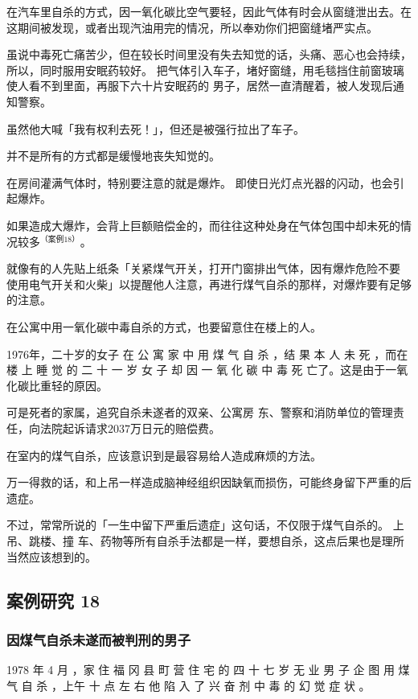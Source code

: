\documentclass[UTF8]{ctexart}
\begin{document}
在汽车里自杀的方式，因一氧化碳比空气要轻，因此气体有时会从窗缝泄出去。在这期间被发现，或者出现汽油用完的情况，所以奉劝你们把窗缝堵严实点。

虽说中毒死亡痛苦少，但在较长时间里没有失去知觉的话，头痛、恶心也会持续，所以，同时服用安眠药较好。
把气体引入车子，堵好窗缝，用毛毯挡住前窗玻璃使人看不到里面，再服下六十片安眠药的 男子，居然一直清醒着，被人发现后通知警察。

虽然他大喊「我有权利去死！」，但还是被强行拉出了车子。

并不是所有的方式都是缓慢地丧失知觉的。 

在房间灌满气体时，特别要注意的就是爆炸。
即使日光灯点光器的闪动，也会引起爆炸。

如果造成大爆炸，会背上巨额赔偿金的，而往往这种处身在气体包围中却未死的情况较多$^{（案例 18）}$。

就像有的人先贴上纸条「关紧煤气开关，打开门窗排出气体，因有爆炸危险不要 使用电气开关和火柴」以提醒他人注意，再进行煤气自杀的那样，对爆炸要有足够的注意。

在公寓中用一氧化碳中毒自杀的方式，也要留意住在楼上的人。

1976年，二十岁的女子 在 公 寓 家 中 用 煤 气 自 杀 ，结 果 本 人 未 死 ，而在 楼 上 睡 觉 的 二 十 一 岁 女 子 却 因 一 氧 化 碳 中 毒 死 亡了。这是由于一氧化碳比重轻的原因。

可是死者的家属，追究自杀未遂者的双亲、公寓房 东、警察和消防单位的管理责任，向法院起诉请求$2037$万日元的赔偿费。

在室内的煤气自杀，应该意识到是最容易给人造成麻烦的方法。

万一得救的话，和上吊一样造成脑神经组织因缺氧而损伤，可能终身留下严重的后遗症。

不过，常常所说的「一生中留下严重后遗症」这句话，不仅限于煤气自杀的。
上吊、跳楼、撞 车、药物等所有自杀手法都是一样，要想自杀，这点后果也是理所当然应该想到的。


\subsection{案例研究 18}

\subsubsection*{因煤气自杀未遂而被判刑的男子}

1978 年 4 月 ，家 住 福 冈 县 町 营 住 宅 的 四 十 七 岁 无 业 男 子 企 图 用 煤 气 自 杀 ，上午 十 点 左 右 他 陷 入 了 兴 奋 剂 中 毒 的 幻 觉 症 状 。
\end{document}
